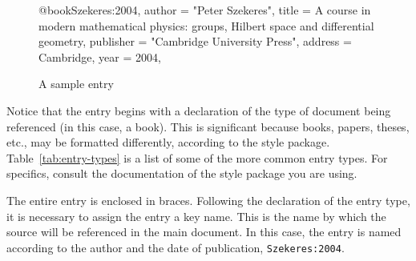 \begin{figure}
  \centering
\begin{boxedverbatim}
@book{Szekeres:2004,
   author = "Peter Szekeres",
   title = {A course in modern mathematical %
     physics: groups, {H}ilbert space and %
     differential geometry},
   publisher = "Cambridge University Press",
   address = Cambridge,
   year = 2004,
}
\end{boxedverbatim}
  \caption{A sample \BibTeX{} entry}
  \label{fig:sample-bibtex}
\end{figure}

Notice that the entry begins with a declaration of the type of
document being referenced (in this case, a book).  This is significant
because books, papers, theses, etc., may be formatted differently,
according to the style package.  Table~\ref{tab:entry-types} is a list
of some of the more common entry types.  For specifics, consult the
documentation of the style package you are using.

\begin{table}
  \centering
  \caption{\BibTeX{} entry types}
  \label{tab:entry-types}
\end{table}

The entire entry is enclosed in braces.  Following the declaration of
the entry type, it is necessary to assign the entry a key name.  This
is the name by which the source will be referenced in the main
document.  In this case, the entry is named according to the author
and the date of publication, \texttt{Szekeres:2004}.

